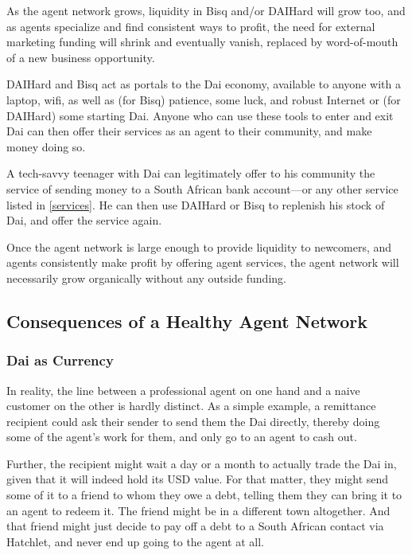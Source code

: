 \documentclass{article}
\begin{document}
As the agent network grows, liquidity in Bisq and/or DAIHard will grow too, and as agents specialize and find consistent ways to profit, the need for external marketing funding will shrink and eventually vanish, replaced by word-of-mouth of a new business opportunity.

DAIHard and Bisq act as portals to the Dai economy, available to anyone with a laptop, wifi, as well as (for Bisq) patience, some luck, and robust Internet or (for DAIHard) some starting Dai. Anyone who can use these tools to enter and exit Dai can then offer their services as an agent to their community, and make money doing so.

A tech-savvy teenager with Dai can legitimately offer to his community the service of sending money to a South African bank account---or any other service listed in \ref{services}. He can then use DAIHard or Bisq to replenish his stock of Dai, and offer the service again.

Once the agent network is large enough to provide liquidity to newcomers, and agents consistently make profit by offering agent services, the agent network will necessarily grow organically without any outside funding.

\subsection{Consequences of a Healthy Agent Network} \label{consequences}

\subsubsection{Dai as Currency} \label{currency}

In reality, the line between a professional agent on one hand and a naive customer on the other is hardly distinct. As a simple example, a remittance recipient could ask their sender to send them the Dai directly, thereby doing some of the agent's work for them, and only go to an agent to cash out.

Further, the recipient might wait a day or a month to actually trade the Dai in, given that it will indeed hold its USD value. For that matter, they might send some of it to a friend to whom they owe a debt, telling them they can bring it to an agent to redeem it. The friend might be in a different town altogether. And that friend might just decide to pay off a debt to a South African contact via Hatchlet, and never end up going to the agent at all.
\end{document}
